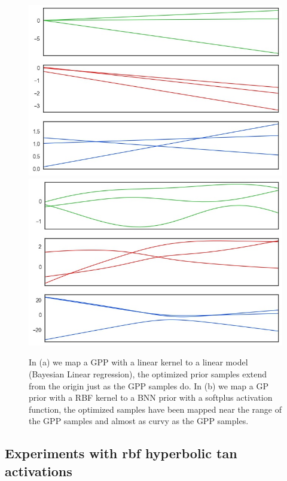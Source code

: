 \documentclass{article}
\begin{document}
\begin{figure}[h]\centering
{
\includegraphics[width=.45\textwidth]{figs/linlin}
}
{
\includegraphics[width=.45\textwidth]{figs/rbfsoftplus}
}
\hspace{3.5cm}
\caption{In (a) we map a GPP with a linear kernel to a linear model (Bayesian Linear regression), 
the optimized prior samples extend from the origin just as the GPP samples do.
In (b) we map a GP prior with a RBF kernel to a BNN prior with a softplus activation function, 
the optimized samples have been mapped near the range of the GPP samples and almost as curvy 
as the GPP samples.
} \label{fig:1}
\end{figure}


\subsection{Experiments with rbf hyperbolic tan activations}
\end{document}
